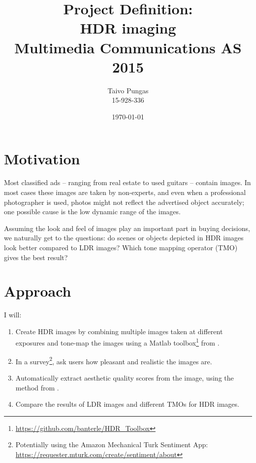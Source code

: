\documentclass[a4paper]{article}
\title{Project Definition: \\ HDR imaging\\ Multimedia Communications AS 2015} %
\author{Taivo Pungas \\ 15-928-336} %
\date{\today} %
\begin{document}
\maketitle %



\section{Motivation}
Most classified ads -- ranging from real estate to used guitars -- contain images. In most cases these images are taken by non-experts, and even when a professional photographer is used, photos might not reflect the advertised object accurately; one possible cause is the low dynamic range of the images.

Assuming the look and feel of images play an important part in buying decisions, we naturally get to the questions: do scenes or objects depicted in HDR images look better compared to LDR images? Which tone mapping operator (TMO) gives the best result?


\section{Approach}

I will:
\begin{enumerate}
	\item Create HDR images by combining multiple images taken at different exposures and tone-map the images using a Matlab toolbox\footnote{\url{https://github.com/banterle/HDR_Toolbox}} from \cite{Banterle:2011}.
	\item In a survey\footnote{Potentially using the Amazon Mechanical Turk Sentiment App: \url{https://requester.mturk.com/create/sentiment/about}}, ask users how pleasant and realistic the images are.
	\item Automatically extract aesthetic quality scores from the image, using the method from \cite{aydin2015automated}.
	\item Compare the results of LDR images and different TMOs for HDR images.
\end{enumerate}
\end{document}
